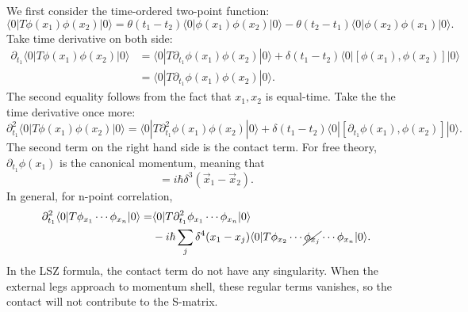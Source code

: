 \begin{framedrmk}
We first consider the time-ordered two-point function:
\begin{equation*}
	\langle 0|T\phi(x_1)\phi(x_2)|0\rangle
	= \theta(t_1-t_2)\langle 0|\phi(x_1)\phi(x_2)|0\rangle -
	\theta(t_2-t_1)\langle 0|\phi(x_2)\phi(x_1)|0\rangle.
\end{equation*}	
Take time derivative on both side:
\begin{equation*}
\begin{aligned}
	\partial_{t_1} \langle 0|T\phi(x_1)\phi(x_2)|0\rangle
	&= \langle 0|T\partial_{t_1}\phi(x_1)\phi(x_2)|0\rangle +
	\delta(t_1-t_2)\langle 0|[\phi(x_1),\phi(x_2)]|0\rangle \\
	&= \langle 0|T\partial_{t_1}\phi(x_1)\phi(x_2)|0\rangle.
\end{aligned}
\end{equation*}
The second equality follows from the fact that $x_1,x_2$ is equal-time.
Take the the time derivative once more:
\begin{equation*}
	\partial^2_{t_1} \langle 0|T\phi(x_1)\phi(x_2)|0\rangle
	= \langle 0|T\partial^2_{t_1}\phi(x_1)\phi(x_2)|0\rangle +
	\delta(t_1-t_2)\langle 0|[\partial_{t_1}\phi(x_1),\phi(x_2)]|0\rangle.
\end{equation*}
The second term on the right hand side is the contact term.
For free theory, $\partial_{t_1}\phi(x_1)$ is the canonical momentum, meaning that
\begin{equation*}
	[\phi(\vec x_1, t),\partial_{t}\phi(\vec x_1,t)] = i \hbar \delta^{3}(\vec x_1-\vec x_2).
\end{equation*}
In general, for n-point correlation,
\begin{equation*}
\begin{aligned}
	 \partial_{t_1}^2 \langle 0|T\phi_{x_1}\cdots\phi_{x_n}|0\rangle 
	=& \langle 0|T\partial_{t_1}^2\phi_{x_1}\cdots\phi_{x_n}|0\rangle \\
	 &-i\hbar \sum_j \delta^4(x_1-x_j)\langle 0|T\phi_{x_2}\cdots\cancel{\phi_{x_j}}\cdots\phi_{x_n}|0\rangle.
\end{aligned}
\end{equation*}
In the LSZ formula, the contact term do not have any singularity.
When the external legs approach to momentum shell, these regular terms vanishes, so the contact will not contribute to the S-matrix.
\end{framedrmk}


